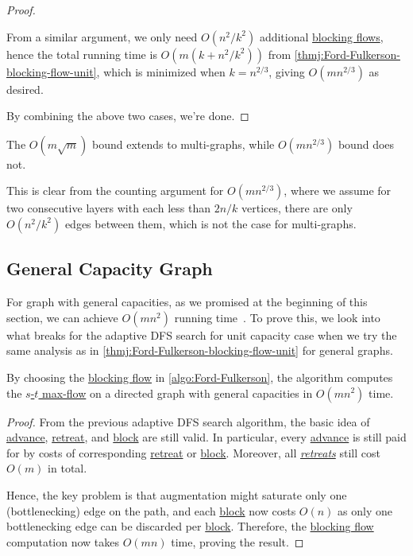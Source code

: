 \begin{proof}
\begin{explanation}
		From a similar argument, we only need \(O(n^2 / k^2)\) additional \hyperref[def:blocking-flow]{blocking flows}, hence the total running time is \(O(m (k + n^2 / k^2))\) from \autoref{thmj:Ford-Fulkerson-blocking-flow-unit}, which is minimized when \(k = n^{2 / 3}\), giving \(O(mn^{2 / 3})\) as desired.
	\end{explanation}

	By combining the above two cases, we're done.
\end{proof}

\begin{remark}
	The \(O(m \sqrt{m} )\) bound extends to multi-graphs, while \(O(mn^{2 / 3})\) bound does not.
\end{remark}
\begin{explanation}
	This is clear from the counting argument for \(O(mn^{2 / 3})\), where we assume for two consecutive layers with each less than \(2n / k\) vertices, there are only \(O(n^2 / k^2)\) edges between them, which is not the case for multi-graphs.
\end{explanation}

\subsection{General Capacity Graph}
For graph with general capacities, as we promised at the beginning of this section, we can achieve \(O(mn^2)\) running time~\cite{karzanov1973finding,dinic1970algorithm,goldberg1998beyond}. To prove this, we look into what breaks for the adaptive DFS search for unit capacity case when we try the same analysis as in \autoref{thmj:Ford-Fulkerson-blocking-flow-unit} for general graphs.

\begin{theorem}\label{thm:Ford-Fulkerson-blocking-flow-general}
	By choosing the \hyperref[def:blocking-flow]{blocking flow} in \autoref{algo:Ford-Fulkerson}, the algorithm computes the \hyperref[prb:s-t-max-flow]{\(s\)-\(t\) max-flow} on a directed graph with general capacities in \(O(mn^2)\) time.
\end{theorem}
\begin{proof}
	From the previous adaptive DFS search algorithm, the basic idea of \hyperref[algo:adaptive-DFS-advance]{advance}, \hyperref[algo:adaptive-DFS-retreat]{retreat}, and \hyperref[algo:adaptive-DFS-block]{block} are still valid. In particular, every \hyperref[algo:adaptive-DFS-advance]{advance} is still paid for by costs of corresponding \hyperref[algo:adaptive-DFS-retreat]{retreat} or \hyperref[algo:adaptive-DFS-block]{block}. Moreover, all \hyperref[algo:adaptive-DFS-retreat]{\emph{retreats}} still cost \(O(m)\) in total.

	Hence, the key problem is that augmentation might saturate only one (bottlenecking) edge on the path, and each \hyperref[algo:adaptive-DFS-block]{block} now costs \(O(n)\) as only one bottlenecking edge can be discarded per \hyperref[algo:adaptive-DFS-block]{block}. Therefore, the \hyperref[def:blocking-flow]{blocking flow} computation now takes \(O(mn)\) time, proving the result.
\end{proof}

